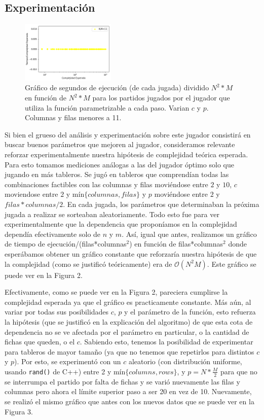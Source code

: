 \documentclass[A4paper,oneside,fleqn,11pt]{article}
\theoremstyle{definition}
\begin{document}
\subsection{Experimentación}


\begin{figure}
	\includegraphics[width=0.4\textwidth]{complejidad2.png}
	\caption{ Gráfico de segundos de ejecución (de cada jugada) dividido $N^2 *M$ en función de $N^2 * M$ para los partidos jugados por el jugador que utiliza la función parametrizable a cada paso. Varian $c$ y $p$. Columnas y filas menores a 11.}
\end{figure}

Si bien el grueso del análisis y experimentación sobre este jugador consistirá en buscar buenos parámetros que mejoren al jugador, consideramos relevante reforzar experimentalmente nuestra hipótesis de complejidad teórica esperada. Para esto tomamos mediciones análogas a las del jugador óptimo solo que jugando en más tableros. Se jugó en tableros que comprendían todas las combinaciones factibles con las columnas y filas moviéndose entre $2$ y $10$, $c$ moviendose entre $2$ y mín$\{columnas,filas\}$ y $p$ moviéndose entre $2$ y $filas*columnas/2$. En cada jugada, los parámetros que determinaban la próxima jugada a realizar se sorteaban aleatoriamente. Todo esto fue para ver experimentalmente que la dependencia que proponíamos en la complejidad dependía efectivamente solo de $n$ y $m$. Así, igual que antes, realizamos un gráfico de tiempo de ejecución/(filas*columnas$^2$) en función de filas*columnas$^2$ donde esperábamos obtener un gráfico constante que reforzaría nuestra hipótesis de que la complejidad (como se justificó teóricamente) era de $\mathcal{O}(N^2 M)$. Este gráfico se puede ver en la Figura 2.




Efectivamente, como se puede ver en la Figura 2, pareciera cumplirse la complejidad esperada ya que el gráfico es practicamente constante. Más aún, al variar por todas sus posibilidades $c$, $p$ y el parámetro de la función, esto refuerza la hipótesis (que se justificó en la explicación del algoritmo) de que esta cota de dependencia no se ve afectada por el parámetro en particular, o la cantidad de fichas que queden, o el $c$. Sabiendo esto, tenemos la posibilidad de experimentar para tableros de mayor tamaño (ya que no tenemos que repetirlos para distintos $c$ y $p$). Por esto, se experimentó con un $c$ aleatorio (con distribución uniforme, usando \texttt{rand()} de C++) entre 2 y mín$\{columns,rows\}$, y $p=N*\frac{M}{2}$ para que no se interrumpa el partido por falta de fichas y se varió nuevamente las filas y columnas pero ahora el límite superior paso a ser 20 en vez de 10. Nuevamente, se realizó el mismo gráfico que antes con los nuevos datos que se puede ver en la Figura 3.
\end{document}
